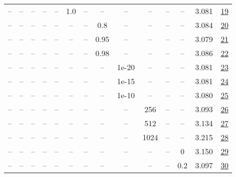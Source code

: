 \begin{table}[H]
\begin{tabular}{cccccccccccccc}
-- & -- & -- & -- & -- & 1.0 & -- & -- & -- & -- & -- & -- & 3.081 & \href{https://wandb.ai/stanford-mercury/optimizer-scaling/runs/sweep-520m-10B-scion9977calr0.008-wd0.1-minlr0-warmup0-b10.98-gn-ed9b95}{19} \\
-- & -- & -- & -- & -- & -- & -- & 0.8 & -- & -- & -- & -- & 3.084 & \href{https://wandb.ai/stanford-mercury/optimizer-scaling/runs/sweep-520m-10B-scion63f66flr0.008-wd0.1-minlr0-warmup0-b10.98-gn-21681b}{20} \\
-- & -- & -- & -- & -- & -- & -- & 0.95 & -- & -- & -- & -- & 3.079 & \href{https://wandb.ai/stanford-mercury/optimizer-scaling/runs/sweep-520m-10B-scionc12795lr0.008-wd0.1-minlr0-warmup0-b10.98-gn-ec659b}{21} \\
-- & -- & -- & -- & -- & -- & -- & 0.98 & -- & -- & -- & -- & 3.086 & \href{https://wandb.ai/stanford-mercury/optimizer-scaling/runs/sweep-520m-10B-scion501dfalr0.008-wd0.1-minlr0-warmup0-b10.98-gn-a9913d}{22} \\
-- & -- & -- & -- & -- & -- & -- & -- & 1e-20 & -- & -- & -- & 3.081 & \href{https://wandb.ai/stanford-mercury/optimizer-scaling/runs/sweep-520m-10B-scion2bd3fdlr0.008-wd0.1-minlr0-warmup0-b10.98-gn-03fce1}{23} \\
-- & -- & -- & -- & -- & -- & -- & -- & 1e-15 & -- & -- & -- & 3.081 & \href{https://wandb.ai/stanford-mercury/optimizer-scaling/runs/sweep-520m-10B-scion9d476clr0.008-wd0.1-minlr0-warmup0-b10.98-gn-8744c9}{24} \\
-- & -- & -- & -- & -- & -- & -- & -- & 1e-10 & -- & -- & -- & 3.080 & \href{https://wandb.ai/stanford-mercury/optimizer-scaling/runs/sweep-520m-10B-scion890acblr0.008-wd0.1-minlr0-warmup0-b10.98-gn-f305ce}{25} \\
-- & -- & -- & -- & -- & -- & -- & -- & -- & 256 & -- & -- & 3.093 & \href{https://wandb.ai/stanford-mercury/optimizer-scaling/runs/sweep-520m-10B-scion277435lr0.008-wd0.1-minlr0-warmup0-b10.98-gn-77a9f9}{26} \\
-- & -- & -- & -- & -- & -- & -- & -- & -- & 512 & -- & -- & 3.134 & \href{https://wandb.ai/stanford-mercury/optimizer-scaling/runs/sweep-520m-10B-scion78b03blr0.008-wd0.1-minlr0-warmup0-b10.98-gn-9b50fe}{27} \\
-- & -- & -- & -- & -- & -- & -- & -- & -- & 1024 & -- & -- & 3.215 & \href{https://wandb.ai/stanford-mercury/optimizer-scaling/runs/sweep-520m-10B-scion3c3da1lr0.008-wd0.1-minlr0-warmup0-b10.98-gn-e9fde3}{28} \\
-- & -- & -- & -- & -- & -- & -- & -- & -- & -- & -- & 0 & 3.150 & \href{https://wandb.ai/stanford-mercury/optimizer-scaling/runs/sweep-520m-10B-scion042572lr0.008-wd0-minlr0-warmup0-b10.98-gn2--bcd543}{29} \\
-- & -- & -- & -- & -- & -- & -- & -- & -- & -- & -- & 0.2 & 3.097 & \href{https://wandb.ai/stanford-mercury/optimizer-scaling/runs/sweep-520m-10B-scion697aa0lr0.008-wd0.2-minlr0-warmup0-b10.98-gn-dd38aa}{30} \\
\bottomrule
\end{tabular}
\end{table}

